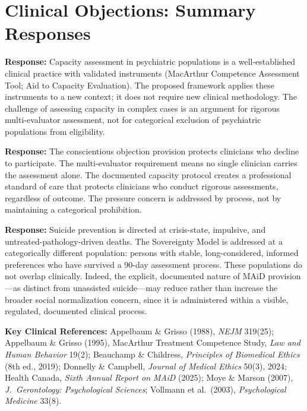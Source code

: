 \documentclass[11pt, letterpaper]{article}
\begin{document}
\section{Clinical Objections: Summary Responses}

\begin{objectionbox}[title={\sffamily\bfseries\small\color{C@warning}
  ``We cannot assess capacity reliably in psychiatric populations''}]
\textbf{Response:} Capacity assessment in psychiatric populations is a well-established
clinical practice with validated instruments (MacArthur Competence Assessment Tool;
Aid to Capacity Evaluation). The proposed framework applies these instruments to a new
context; it does not require new clinical methodology. The challenge of assessing
capacity in complex cases is an argument for rigorous multi-evaluator assessment, not
for categorical exclusion of psychiatric populations from eligibility.
\end{objectionbox}

\medskip

\begin{objectionbox}[title={\sffamily\bfseries\small\color{C@warning}
  ``Psychiatrists will face pressure to approve requests against their clinical judgment''}]
\textbf{Response:} The conscientious objection provision protects clinicians who
decline to participate. The multi-evaluator requirement means no single clinician
carries the assessment alone. The documented capacity protocol creates a professional
standard of care that protects clinicians who conduct rigorous assessments, regardless
of outcome. The pressure concern is addressed by process, not by maintaining a
categorical prohibition.
\end{objectionbox}

\medskip

\begin{objectionbox}[title={\sffamily\bfseries\small\color{C@warning}
  ``This will normalize suicide and undermine suicide prevention''}]
\textbf{Response:} Suicide prevention is directed at crisis-state, impulsive, and
untreated-pathology-driven deaths. The Sovereignty Model is addressed at a categorically
different population: persons with stable, long-considered, informed preferences who
have survived a 90-day assessment process. These populations do not overlap clinically.
Indeed, the explicit, documented nature of MAiD provision---as distinct from unassisted
suicide---may reduce rather than increase the broader social normalization concern,
since it is administered within a visible, regulated, documented clinical process.
\end{objectionbox}

\bigskip
{\small\sffamily\color{C@midgray}
\textbf{Key Clinical References:}
Appelbaum \& Grisso (1988), \textit{NEJM} 319(25);
Appelbaum \& Grisso (1995), MacArthur Treatment Competence Study, \textit{Law and Human Behavior} 19(2);
Beauchamp \& Childress, \textit{Principles of Biomedical Ethics} (8th ed., 2019);
Donnelly \& Campbell, \textit{Journal of Medical Ethics} 50(3), 2024;
Health Canada, \textit{Sixth Annual Report on MAiD} (2025);
Moye \& Marson (2007), \textit{J.\ Gerontology: Psychological Sciences};
Vollmann et al.\ (2003), \textit{Psychological Medicine} 33(8).
}
\end{document}
